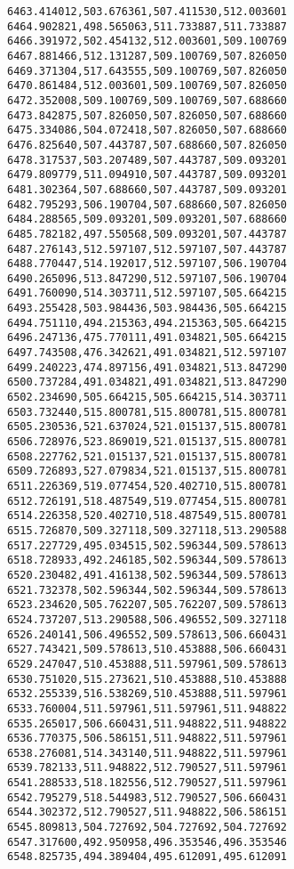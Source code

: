 \documentclass[11pt]{article}
\begin{document}
\begin{Verbatim}[commandchars=\\\{\}]
6463.414012,503.676361,507.411530,512.003601
6464.902821,498.565063,511.733887,511.733887
6466.391972,502.454132,512.003601,509.100769
6467.881466,512.131287,509.100769,507.826050
6469.371304,517.643555,509.100769,507.826050
6470.861484,512.003601,509.100769,507.826050
6472.352008,509.100769,509.100769,507.688660
6473.842875,507.826050,507.826050,507.688660
6475.334086,504.072418,507.826050,507.688660
6476.825640,507.443787,507.688660,507.826050
6478.317537,503.207489,507.443787,509.093201
6479.809779,511.094910,507.443787,509.093201
6481.302364,507.688660,507.443787,509.093201
6482.795293,506.190704,507.688660,507.826050
6484.288565,509.093201,509.093201,507.688660
6485.782182,497.550568,509.093201,507.443787
6487.276143,512.597107,512.597107,507.443787
6488.770447,514.192017,512.597107,506.190704
6490.265096,513.847290,512.597107,506.190704
6491.760090,514.303711,512.597107,505.664215
6493.255428,503.984436,503.984436,505.664215
6494.751110,494.215363,494.215363,505.664215
6496.247136,475.770111,491.034821,505.664215
6497.743508,476.342621,491.034821,512.597107
6499.240223,474.897156,491.034821,513.847290
6500.737284,491.034821,491.034821,513.847290
6502.234690,505.664215,505.664215,514.303711
6503.732440,515.800781,515.800781,515.800781
6505.230536,521.637024,521.015137,515.800781
6506.728976,523.869019,521.015137,515.800781
6508.227762,521.015137,521.015137,515.800781
6509.726893,527.079834,521.015137,515.800781
6511.226369,519.077454,520.402710,515.800781
6512.726191,518.487549,519.077454,515.800781
6514.226358,520.402710,518.487549,515.800781
6515.726870,509.327118,509.327118,513.290588
6517.227729,495.034515,502.596344,509.578613
6518.728933,492.246185,502.596344,509.578613
6520.230482,491.416138,502.596344,509.578613
6521.732378,502.596344,502.596344,509.578613
6523.234620,505.762207,505.762207,509.578613
6524.737207,513.290588,506.496552,509.327118
6526.240141,506.496552,509.578613,506.660431
6527.743421,509.578613,510.453888,506.660431
6529.247047,510.453888,511.597961,509.578613
6530.751020,515.273621,510.453888,510.453888
6532.255339,516.538269,510.453888,511.597961
6533.760004,511.597961,511.597961,511.948822
6535.265017,506.660431,511.948822,511.948822
6536.770375,506.586151,511.948822,511.597961
6538.276081,514.343140,511.948822,511.597961
6539.782133,511.948822,512.790527,511.597961
6541.288533,518.182556,512.790527,511.597961
6542.795279,518.544983,512.790527,506.660431
6544.302372,512.790527,511.948822,506.586151
6545.809813,504.727692,504.727692,504.727692
6547.317600,492.950958,496.353546,496.353546
6548.825735,494.389404,495.612091,495.612091

\end{Verbatim}
\end{document}

